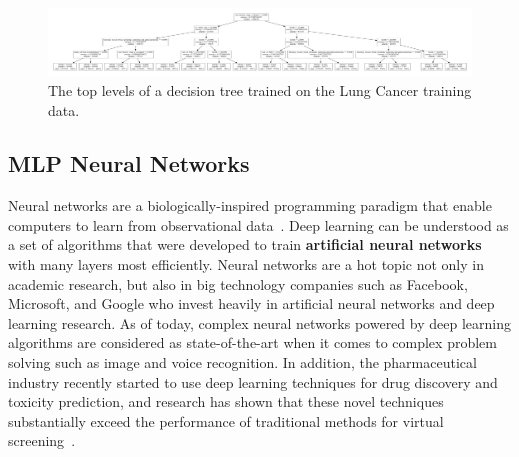 \documentclass[a4paper,11pt]{article}
\begin{document}
\begin{figure}
\centering 
\begin{center}
\includegraphics[width=.95\textwidth,origin=c]{lungdt.pdf}
\caption{\label{fig:lungdt} The top levels of a decision tree trained on the Lung Cancer training data.}
\end{center}
\end{figure}




\subsection{MLP Neural Networks}


Neural networks are a biologically-inspired programming paradigm that enable computers to learn from observational data~\cite{deeplearning}.
Deep learning can be understood as a set of algorithms that were developed to train \textbf{artificial neural networks} with many layers most efficiently.
 Neural networks are a hot topic not only in academic research, but also in big technology companies such as Facebook, Microsoft, and Google who invest heavily in artificial neural networks and deep learning research. As of today, complex neural networks powered by deep learning algorithms are considered as state-of-the-art when it comes to complex problem solving such as image and voice recognition.
In addition, the pharmaceutical industry recently started to use deep learning techniques for drug discovery and toxicity prediction, and research has shown that these novel techniques substantially exceed the performance of traditional methods for virtual screening~\cite{toxicity}.
\end{document}
